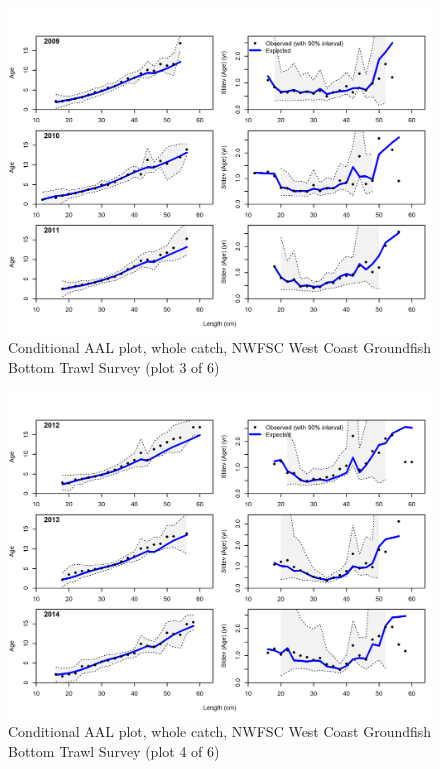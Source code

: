 \documentclass[12pt,]{article}
\begin{document}
\begin{figure}
\centering
\includegraphics{r4ss/plots_mod1/comp_condAALfit_Andre_plotsflt7mkt0_page3.png}
\caption{Conditional AAL plot, whole catch, NWFSC West Coast Groundfish
Bottom Trawl Survey (plot 3 of 6) \label{fig:nwfsc_combo_andre_3}}
\end{figure}

\begin{figure}
\centering
\includegraphics{r4ss/plots_mod1/comp_condAALfit_Andre_plotsflt7mkt0_page4.png}
\caption{Conditional AAL plot, whole catch, NWFSC West Coast Groundfish
Bottom Trawl Survey (plot 4 of 6) \label{fig:nwfsc_combo_andre_4}}
\end{figure}
\end{document}
